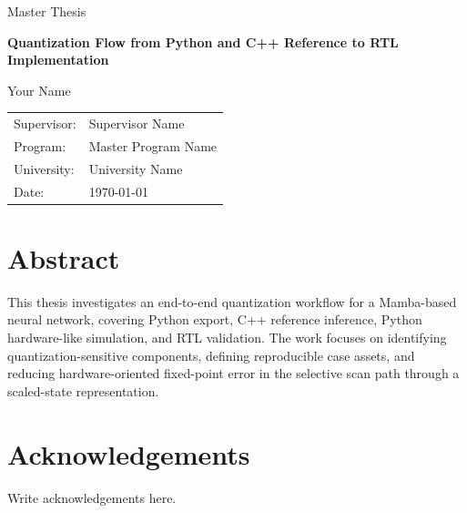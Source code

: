 \documentclass[12pt,a4paper,oneside]{report}
\begin{document}
\begin{titlepage}
  \centering
  \vspace*{2cm}
  {\Large Master Thesis\par}
  \vspace{1.5cm}
  {\huge\bfseries Quantization Flow from Python and C++ Reference to RTL Implementation\par}
  \vspace{1.5cm}
  {\Large Your Name\par}
  \vfill
  \begin{tabular}{ll}
    Supervisor: & Supervisor Name \\
    Program: & Master Program Name \\
    University: & University Name \\
    Date: & \today
  \end{tabular}
\end{titlepage}


\chapter*{Abstract}
This thesis investigates an end-to-end quantization workflow for a Mamba-based neural network, covering Python export, C++ reference inference, Python hardware-like simulation, and RTL validation. The work focuses on identifying quantization-sensitive components, defining reproducible case assets, and reducing hardware-oriented fixed-point error in the selective scan path through a scaled-state representation.

\chapter*{Acknowledgements}
Write acknowledgements here.

\tableofcontents
\listoffigures
\listoftables

\clearpage
{}







\appendix




\end{document}
